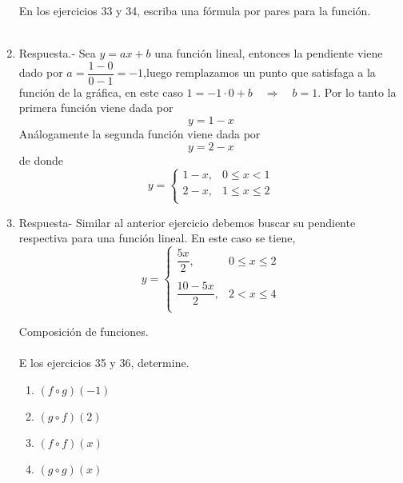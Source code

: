 \begin{enumerate}[\bfseries 1.]
En los ejercicios 33 y 34, escriba una fórmula por pares para la función.\\\\

\item Respuesta.-\; Sea $y=ax+b$ una función lineal, entonces la pendiente viene dado por $a = \dfrac{1-0}{0-1}=-1$,luego remplazamos un punto que satisfaga a la función de la gráfica, en este caso $1=-1\cdot 0 + b \quad \Longrightarrow \quad b = 1$. Por lo tanto la primera función viene dada por $$y = 1-x$$
    Análogamente la segunda función viene dada por $$y = 2-x$$
    de donde 
    $$y=\left\{\begin{array}{lr}
	1-x,&0\leq x < 1\\
	2-x,&1\leq x \leq 2\\
    \end{array}\right.$$
    \vspace{.5cm}

\item Respuesta-\; Similar al anterior ejercicio debemos buscar su pendiente respectiva para una función lineal. En este caso se tiene,
    $$y = \left\{\begin{array}{lr}
	\dfrac{5x}{2},&0\leq x \leq 2\\\\
	\dfrac{10-5x}{2},&2<x\leq 4\\
    \end{array}\right.$$
    \vspace{.5cm}

Composición de funciones.\\\\
E los ejercicios 35 y 36, determine.
\begin{multicols}{2}
\begin{enumerate}[\bfseries a)]

    \item $(f\circ g)(-1)$\\

    \item $(g\circ f)(2)$\\

    \item $(f\circ f)(x)$\\

    \item $(g\circ g)(x)$\\


\end{enumerate}
\end{multicols}
\end{enumerate}
